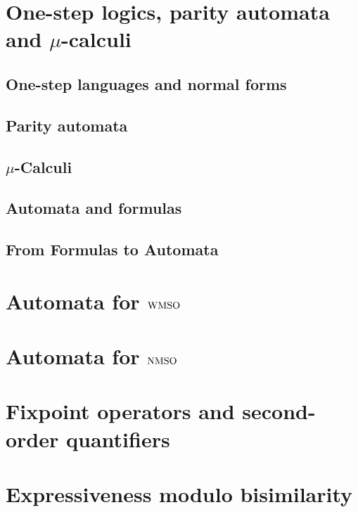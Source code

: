 \documentclass[prodmode,acmtecs]{acmsmall} %
\begin{document}
\section{One-step logics, parity automata and $\mu$-calculi}\label{sec:parityaut}


\subsection{One-step languages and normal forms}\label{sec:onestep-short}


\subsection{Parity automata}\label{sec:parityaut}


\subsection{$\mu$-Calculi}\label{sec:onestep-to-mc}


\subsection{Automata and formulas}\label{sec:parity-to-mc}


\subsection{From Formulas to Automata}\label{sec:mc-to-parity}


\clearpage

\section{Automata for $\mathrm{WMSO}$}\label{sec:autwmso}

\clearpage

\section{Automata for $\mathrm{NMSO}$}\label{sec:autnmso}

\clearpage

\section{Fixpoint operators and second-order quantifiers}



\clearpage

\section{Expressiveness modulo bisimilarity}\label{sec:expresso}

\clearpage





\end{document}
